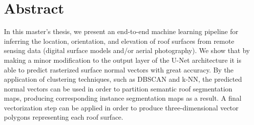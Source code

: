 \chapter*{Abstract}

In this master's thesis, we present an end-to-end machine learning pipeline for inferring the location, orientation, and elevation of roof surfaces from remote sensing data (digital surface models and/or aerial photography).
We show that by making a minor modification to the output layer of the U-Net architecture it is able to predict rasterized surface normal vectors with great accuracy.
By the application of clustering techniques, such as DBSCAN and k-NN, the predicted normal vectors can be used in order to partition semantic roof segmentation maps, producing corresponding instance segmentation maps as a result.
A final vectorization step can be applied in order to produce three-dimensional vector polygons representing each roof surface.

